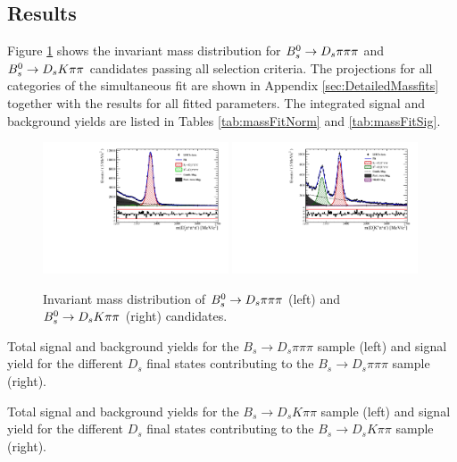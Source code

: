 \subsection{Results}
\label{subsec:Results}

Figure \ref{fig:massFit} shows the invariant mass distribution for ${{B}^0_{s}}\rightarrow{\ensuremath{{D}_{s}}}{\ensuremath{\pi}}{\ensuremath{\pi}}{\ensuremath{\pi}}$ and  ${{B}^0_{s}}\rightarrow{\ensuremath{{D}_{s}}}{\ensuremath{K}}{\ensuremath{\pi}}{\ensuremath{\pi}}$ candidates passing all selection criteria.
The projections for all categories of the simultaneous fit are shown in Appendix \ref{sec:DetailedMassfits} together with the results for all fitted parameters.
The integrated signal and background yields are listed in Tables \ref{tab:massFitNorm} and \ref{tab:massFitSig}.

\begin{figure}[h]
\centering
\includegraphics[height=!,width=0.49\textwidth]{figs/MassFit/norm_pull.pdf}
\includegraphics[height=!,width=0.49\textwidth]{figs/MassFit/signal_pull.pdf}
\caption{Invariant mass distribution of ${{B}^0_{s}}\rightarrow{\ensuremath{{D}_{s}}}{\ensuremath{\pi}}{\ensuremath{\pi}}{\ensuremath{\pi}}$ (left) and  ${{B}^0_{s}}\rightarrow{\ensuremath{{D}_{s}}}{\ensuremath{K}}{\ensuremath{\pi}}{\ensuremath{\pi}}$ (right) candidates.}
\label{fig:massFit}
\end{figure}

\clearpage
\begin{table}[h]
\centering
\caption{Total signal and background yields for the $B_s \to D_s \pi \pi \pi$ sample (left) and
signal yield for the different $D_s$ final states contributing to the $B_s \to D_s \pi \pi \pi$ sample (right).}
 \hfill

\label{tab:massFitNorm}
\end{table}
\begin{table}[h]
\centering
\caption{Total signal and background yields for the $B_s \to D_s K \pi \pi$ sample (left) and
signal yield for the different $D_s$ final states contributing to the $B_s \to D_s  K \pi \pi$ sample (right).}
 \hfill

\label{tab:massFitSig}
\end{table}


